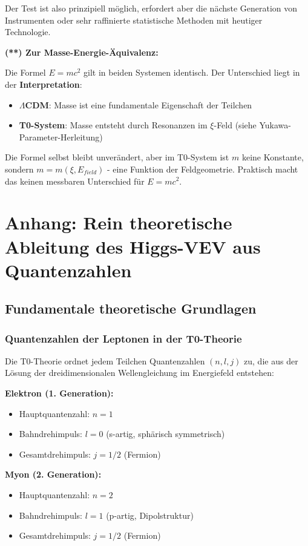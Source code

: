 Der Test ist also prinzipiell möglich, erfordert aber die nächste Generation von Instrumenten oder sehr raffinierte statistische Methoden mit heutiger Technologie.

\textbf{(**) Zur Masse-Energie-Äquivalenz:}

Die Formel $E = mc^2$ gilt in beiden Systemen identisch. Der Unterschied liegt in der \textbf{Interpretation}:

\begin{itemize}
	\item \textbf{$\Lambda$CDM}: Masse ist eine fundamentale Eigenschaft der Teilchen
	\item \textbf{T0-System}: Masse entsteht durch Resonanzen im $\xi$-Feld (siehe Yukawa-Parameter-Herleitung)
\end{itemize}

Die Formel selbst bleibt unverändert, aber im T0-System ist $m$ keine Konstante, sondern $m = m(\xi, E_{field})$ - eine Funktion der Feldgeometrie. Praktisch macht das keinen messbaren Unterschied für $E = mc^2$.
\appendix

\section{Anhang: Rein theoretische Ableitung des Higgs-VEV aus Quantenzahlen}

\subsection{Fundamentale theoretische Grundlagen}

\subsubsection{Quantenzahlen der Leptonen in der T0-Theorie}

Die T0-Theorie ordnet jedem Teilchen Quantenzahlen $(n, l, j)$ zu, die aus der Lösung der dreidimensionalen Wellengleichung im Energiefeld entstehen:

\textbf{Elektron (1. Generation):}
\begin{itemize}
	\item Hauptquantenzahl: $n = 1$
	\item Bahndrehimpuls: $l = 0$ (s-artig, sphärisch symmetrisch)
	\item Gesamtdrehimpuls: $j = 1/2$ (Fermion)
\end{itemize}

\textbf{Myon (2. Generation):}
\begin{itemize}
	\item Hauptquantenzahl: $n = 2$
	\item Bahndrehimpuls: $l = 1$ (p-artig, Dipolstruktur)
	\item Gesamtdrehimpuls: $j = 1/2$ (Fermion)
\end{itemize}

